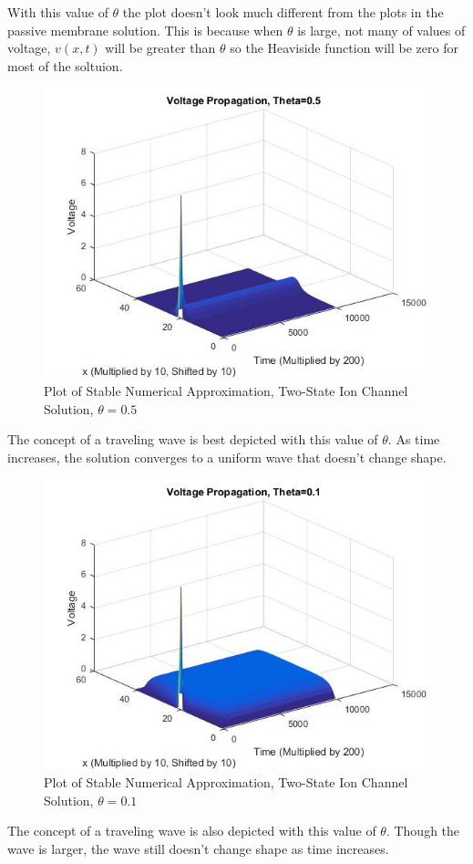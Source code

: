 \documentclass[12pt]{article}
\begin{document}
With this value of $\theta$ the plot doesn't look much different from the plots in the passive membrane solution. This is because when $\theta$ is large, not many of values of voltage, $v(x,t)$ will be greater than $\theta$ so the Heaviside function will be zero for most of the soltuion. 
\begin{figure}[H]
  \includegraphics[width=\linewidth]{thetatwo.jpg}
  \caption{Plot of Stable Numerical Approximation, Two-State Ion Channel Solution, $\theta=0.5$}
  \label{fig:sketch5}
\end{figure}
The concept of a traveling wave is best depicted with this value of $\theta$. As time increases, the solution converges to a uniform wave that doesn't change shape.
\begin{figure}[H]
  \includegraphics[width=\linewidth]{thetathree.jpg}
  \caption{Plot of Stable Numerical Approximation, Two-State Ion Channel Solution, $\theta=0.1$}
  \label{fig:sketch6}
\end{figure}
The concept of a traveling wave is also depicted with this value of $\theta$. Though the wave is larger, the wave still doesn't change shape as time increases. 
\end{document}

